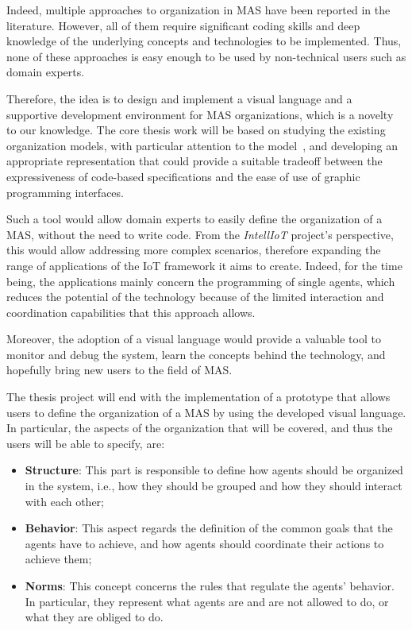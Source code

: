 Indeed, multiple approaches to organization in MAS have been reported in the literature.
However, all of them require significant coding skills and deep knowledge of the underlying concepts and technologies to be implemented.
Thus, none of these approaches is easy enough to be used by non-technical users such as domain experts.

Therefore, the idea is to design and implement a visual language and a supportive development environment for MAS organizations, which is a novelty to our knowledge.
The core thesis work will be based on studying the existing organization models, with particular attention to the \moiseplus{} model~\cite{10.1145/544741.544858}, and developing an appropriate representation that could provide a suitable tradeoff between the expressiveness of code-based specifications and the ease of use of graphic programming interfaces.

Such a tool would allow domain experts to easily define the organization of a MAS, without the need to write code.
From the \textit{IntellIoT} project's perspective, this would allow addressing more complex scenarios, therefore expanding the range of applications of the IoT framework it aims to create.
Indeed, for the time being, the applications mainly concern the programming of single agents, which reduces the potential of the technology because of the limited interaction and coordination capabilities that this approach allows.

Moreover, the adoption of a visual language would provide a valuable tool to monitor and debug the system, learn the concepts behind the technology, and hopefully bring new users to the field of MAS.

The thesis project will end with the implementation of a prototype that allows users to define the organization of a MAS by using the developed visual language.
In particular, the aspects of the organization that will be covered, and thus the users will be able to specify, are:
\begin{itemize}
    \item \textbf{Structure}: This part is responsible to define how agents should be organized in the system, i.e., how they should be grouped and how they should interact with each other;
    \item \textbf{Behavior}: This aspect regards the definition of the common goals that the agents have to achieve, and how agents should coordinate their actions to achieve them;
    \item \textbf{Norms}: This concept concerns the rules that regulate the agents' behavior.
    In particular, they represent what agents are and are not allowed to do, or what they are obliged to do.
\end{itemize}


